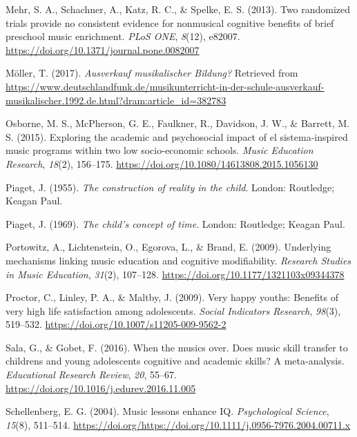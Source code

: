 \documentclass[a4, 12pt]{article}
\begin{document}
\leavevmode\hypertarget{ref-Mehr2013}{}%
Mehr, S. A., Schachner, A., Katz, R. C., \& Spelke, E. S. (2013). Two randomized trials provide no consistent evidence for nonmusical cognitive benefits of brief preschool music enrichment. \emph{PLoS ONE}, \emph{8}(12), e82007. \url{https://doi.org/10.1371/journal.pone.0082007}

\leavevmode\hypertarget{ref-Moeller2017}{}%
Möller, T. (2017). \emph{Ausverkauf musikalischer Bildung?} Retrieved from \url{https://www.deutschlandfunk.de/musikunterricht-in-der-schule-ausverkauf-musikalischer.1992.de.html?dram:article_id=382783}

\leavevmode\hypertarget{ref-Osborne2015}{}%
Osborne, M. S., McPherson, G. E., Faulkner, R., Davidson, J. W., \& Barrett, M. S. (2015). Exploring the academic and psychosocial impact of el sistema-inspired music programs within two low socio-economic schools. \emph{Music Education Research}, \emph{18}(2), 156--175. \url{https://doi.org/10.1080/14613808.2015.1056130}

\leavevmode\hypertarget{ref-Piaget1955}{}%
Piaget, J. (1955). \emph{The construction of reality in the child}. London: Routledge; Keagan Paul.

\leavevmode\hypertarget{ref-Piaget1969}{}%
Piaget, J. (1969). \emph{The child's concept of time}. London: Routledge; Keagan Paul.

\leavevmode\hypertarget{ref-Portowitz2009}{}%
Portowitz, A., Lichtenstein, O., Egorova, L., \& Brand, E. (2009). Underlying mechanisms linking music education and cognitive modifiability. \emph{Research Studies in Music Education}, \emph{31}(2), 107--128. \url{https://doi.org/10.1177/1321103x09344378}

\leavevmode\hypertarget{ref-Proctor2009a}{}%
Proctor, C., Linley, P. A., \& Maltby, J. (2009). Very happy youths: Benefits of very high life satisfaction among adolescents. \emph{Social Indicators Research}, \emph{98}(3), 519--532. \url{https://doi.org/10.1007/s11205-009-9562-2}

\leavevmode\hypertarget{ref-Sala2016}{}%
Sala, G., \& Gobet, F. (2016). When the musics over. Does music skill transfer to childrens and young adolescents cognitive and academic skills? A meta-analysis. \emph{Educational Research Review}, \emph{20}, 55--67. \url{https://doi.org/10.1016/j.edurev.2016.11.005}

\leavevmode\hypertarget{ref-Schellenberg2004}{}%
Schellenberg, E. G. (2004). Music lessons enhance IQ. \emph{Psychological Science}, \emph{15}(8), 511--514. \url{https://doi.org/https://doi.org/10.1111/j.0956-7976.2004.00711.x}
\end{document}
